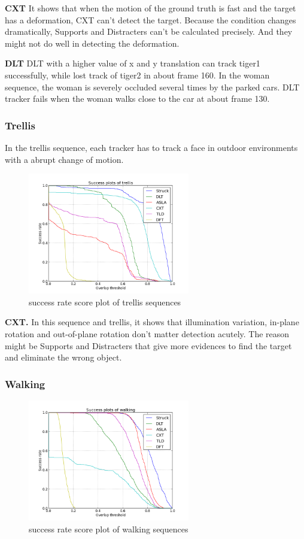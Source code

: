 \documentclass{acm_proc_article-sp}
\begin{document}
\textbf{CXT} It shows that when the motion of the ground truth is fast and the target has a deformation, CXT can't detect the target. Because the condition changes dramatically, Supports and Distracters can't be calculated precisely. And they might not do well in detecting the deformation.

\textbf{DLT} DLT with a higher value of x and y translation can track tiger1 successfully, while lost track of tiger2 in about frame 160. In the woman sequence, the woman is severely occluded several times by the parked cars. DLT tracker fails when the woman walks close to the car at about frame 130.

\subsubsection{Trellis}

In the trellis sequence, each tracker has to track a face in outdoor environments with a abrupt change of motion.

\begin{figure}[hbt]
	\centering
    \includegraphics[width=200pt]{trellis}
    \caption{success rate score plot of trellis sequences}
    \label{fig:trellis}
\end{figure}

\textbf{CXT.} In this sequence and trellis, it shows that illumination variation, in-plane rotation and out-of-plane rotation don't matter detection acutely. The reason might be Supports and Distracters that give more evidences to find the target and eliminate the wrong object.

\subsubsection{Walking}

\begin{figure}[hbt]
	\centering
    \includegraphics[width=200pt]{walking}
    \caption{success rate score plot of walking sequences}
    \label{fig:walking}
\end{figure}
\end{document}
